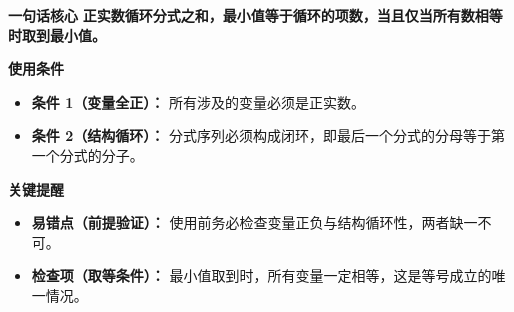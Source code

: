 \begin{summarybox}
\textbf{\textcolor{CSummary}{一句话核心}}
\textbf{正实数循环分式之和，最小值等于循环的项数，当且仅当所有数相等时取到最小值。}

\medskip
\textbf{\textcolor{CSummary}{使用条件}}
\begin{itemize}[leftmargin=*, itemsep=0.5em, topsep=0.4em]
    \item \textbf{条件 1（变量全正）：} 所有涉及的变量必须是正实数。
    \item \textbf{条件 2（结构循环）：} 分式序列必须构成闭环，即最后一个分式的分母等于第一个分式的分子。
\end{itemize}

\medskip
\textbf{\textcolor{CSummary}{关键提醒}}
\begin{itemize}[leftmargin=*, itemsep=0.5em, topsep=0.4em]
    \item \textbf{易错点（前提验证）：} 使用前务必检查变量正负与结构循环性，两者缺一不可。
    \item \textbf{检查项（取等条件）：} 最小值取到时，所有变量一定相等，这是等号成立的唯一情况。
\end{itemize}
\end{summarybox}
